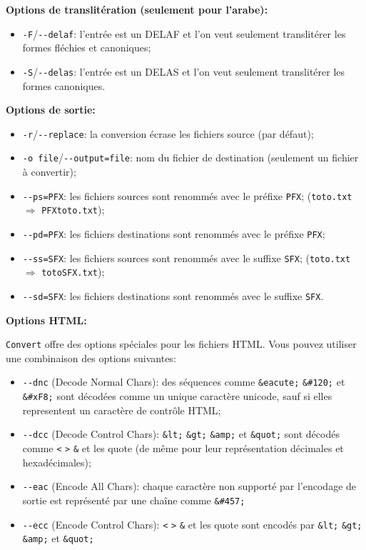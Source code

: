 \bigskip
\noindent \textbf{Options de translitération (seulement pour l'arabe):}
\begin{itemize}
\item \verb+-F+/\verb+--delaf+: l'entrée est un DELAF et l'on veut seulement translitérer les formes
	fléchies et canoniques;
\item \verb+-S+/\verb+--delas+: l'entrée est un DELAS et l'on veut seulement translitérer les formes
	canoniques.
\end{itemize}


\bigskip
\noindent \textbf{Options de sortie:}
\begin{itemize}
\item \verb+-r+/\verb+--replace+: la conversion écrase les fichiers source (par défaut);
\item \verb+-o file+/\verb+--output=file+: nom du fichier de destination (seulement un fichier à convertir);
\item \verb+--ps=PFX+: les fichiers sources sont renommés avec le préfixe \verb+PFX+;
        (\verb+toto.txt+ $\Rightarrow$ \verb+PFXtoto.txt+);
\item \verb+--pd=PFX+: les fichiers destinations sont renommés avec le préfixe \verb+PFX+;
\item \verb+--ss=SFX+: les fichiers sources sont renommés avec le suffixe \verb+SFX+;
        (\verb+toto.txt+ $\Rightarrow$ \verb+totoSFX.txt+);
\item \verb+--sd=SFX+: les fichiers destinations sont renommés avec le suffixe \verb+SFX+.
\end{itemize}

\bigskip
\noindent \textbf{Options HTML:}

\noindent \verb+Convert+ offre des options spéciales pour les fichiers HTML. Vous pouvez utiliser  une combinaison des options suivantes:

\begin{itemize}
\item \verb+--dnc+ (Decode Normal Chars): des séquences comme \verb+&eacute;+
	\verb+&#120;+ et \verb+&#xF8;+ sont décodées comme un unique caractère
	unicode, sauf si elles representent un caractère de contrôle HTML;
  
  \item \verb+--dcc+ (Decode Control Chars): \verb+&lt;+ \verb+&gt;+
  	  \verb+&amp;+ et \verb+&quot;+ sont décodés comme \verb+<+ \verb+>+
  \verb+&+ et les quote (de même pour leur représentation  décimales et hexadécimales);
  
  \item \verb+--eac+ (Encode All Chars): chaque caractère non supporté par l'encodage de sortie
  	  est représenté par une chaîne comme \verb+&#457;+
  
  \item \verb+--ecc+ (Encode Control Chars): \verb+<+ \verb+>+
  	  \verb+&+ et les  quote sont encodés par \verb+&lt;+ \verb+&gt;+
  	  \verb+&amp;+ et \verb+&quot;+
\end{itemize} 

